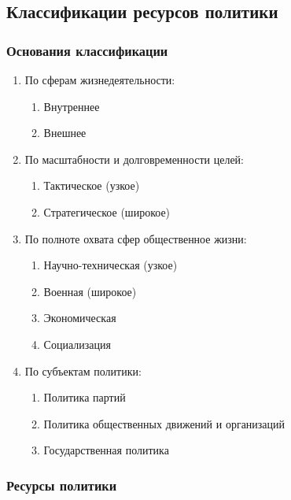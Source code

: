 \subsection{Классификации ресурсов политики}

\subsubsection{Основания классификации}

\begin{enumerate}
  \item По сферам жизнедеятельности:
        \begin{enumerate}
          \item Внутреннее
          \item Внешнее
        \end{enumerate}

  \item По масштабности и долговременности целей:
        \begin{enumerate}
          \item Тактическое (узкое)
          \item Стратегическое (широкое)
        \end{enumerate}

  \item По полноте охвата сфер общественное жизни:
        \begin{enumerate}
          \item Научно-техническая (узкое)
          \item Военная (широкое)
          \item Экономическая
          \item Социализация
        \end{enumerate}

  \item По субъектам политики:
        \begin{enumerate}
          \item Политика партий
          \item Политика общественных движений и организаций
          \item Государственная политика
        \end{enumerate}
\end{enumerate}

\subsubsection{Ресурсы политики}

